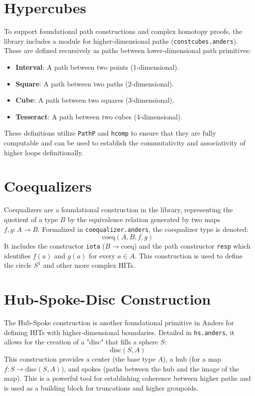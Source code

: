 \documentclass[11pt]{article}
\begin{document}
\newpage
\section{Hypercubes}

To support foundational path constructions and complex homotopy proofs, the library includes a module for higher-dimensional paths (\texttt{constcubes.anders}). These are defined recursively as paths between lower-dimensional path primitives:
\begin{itemize}
    \item \textbf{Interval}: A path between two points (1-dimensional).
    \item \textbf{Square}: A path between two paths (2-dimensional).
    \item \textbf{Cube}: A path between two squares (3-dimensional).
    \item \textbf{Tesseract}: A path between two cubes (4-dimensional).
\end{itemize}
These definitions utilize \texttt{PathP} and \texttt{hcomp} to ensure that they are fully computable and can be used to establish the commutativity and associativity of higher loops definitionally.

\section{Coequalizers}

Coequalizers are a foundational construction in the library, representing the quotient of a type $B$ by the equivalence relation generated by two maps $f, g : A \to B$. Formalized in \texttt{coequalizer.anders}, the coequalizer type is denoted:
\begin{equation}
    \text{coeq}(A, B, f, g)
\end{equation}
It includes the constructor \texttt{iota} ($B \to \text{coeq}$) and the path constructor \texttt{resp} which identifies $f(a)$ and $g(a)$ for every $a \in A$. This construction is used to define the circle $S^1$ and other more complex HITs.

\section{Hub-Spoke-Disc Construction}

The Hub-Spoke construction is another foundational primitive in Anders for defining HITs with higher-dimensional boundaries. Detailed in \texttt{hs.anders}, it allows for the creation of a "disc" that fills a sphere $S$:
\begin{equation}
    \text{disc}(S, A)
\end{equation}
This construction provides a center (the base type $A$), a hub (for a map $f : S \to \text{disc}(S, A)$), and spokes (paths between the hub and the image of the map). This is a powerful tool for establishing coherence between higher paths and is used as a building block for truncations and higher groupoids.
\end{document}

